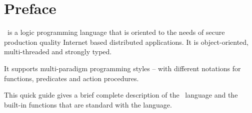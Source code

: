 \chapter*{Preface}
\go\ is a logic programming language that is oriented to the needs of secure production quality Internet based distributed applications. It is object-oriented, multi-threaded and strongly typed. 

It supports multi-paradigm programming styles -- with different notations for functions, predicates and action procedures.

This quick guide gives a brief complete description of the \go\ language and the built-in functions that are standard with the language.

 